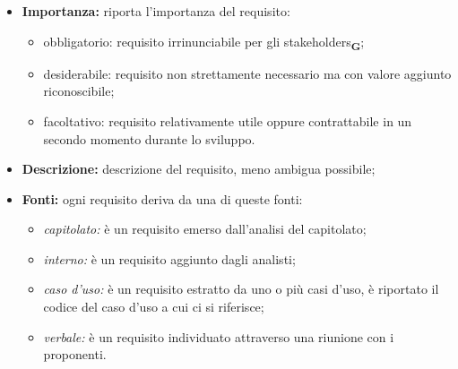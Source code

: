 \begin{itemize}
    \item \textbf{Importanza:} riporta l'importanza del requisito:
          \begin{itemize}
              \item obbligatorio: requisito irrinunciabile per gli stakeholders\textsubscript{\textbf{G}};
              \item desiderabile: requisito non strettamente necessario ma con valore aggiunto riconoscibile;
              \item facoltativo: requisito relativamente utile oppure contrattabile in un secondo momento durante lo sviluppo.
          \end{itemize}
    \item \textbf{Descrizione:} descrizione del requisito, meno ambigua possibile;
    \item \textbf{Fonti:} ogni requisito deriva da una di queste fonti:
          \begin{itemize}
              \item \textit{capitolato:} è un requisito emerso dall'analisi del capitolato;
              \item \textit{interno:} è un requisito aggiunto dagli analisti;
              \item \textit{caso d'uso:} è un requisito estratto da uno o più casi d'uso, è riportato il codice del caso d'uso a cui ci si riferisce;
              \item \textit{verbale:} è un requisito individuato attraverso una riunione con i proponenti.
          \end{itemize}
\end{itemize}

\newpage
